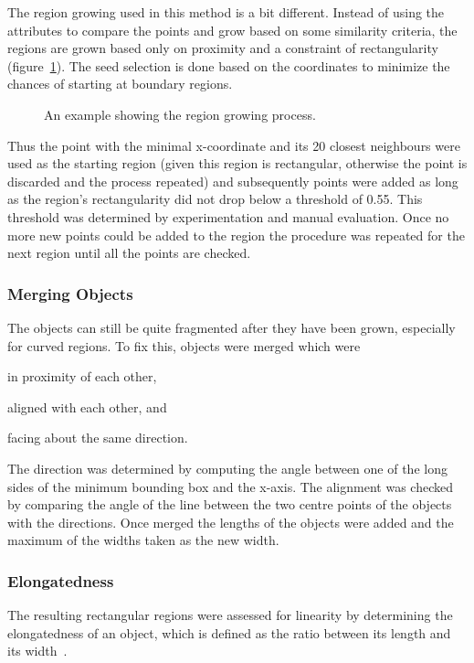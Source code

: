 {The region growing used in this method is a bit different. Instead of using the attributes to compare the points and grow based on some similarity criteria, the regions are grown based only on proximity and a constraint of rectangularity (figure~\ref{fig:regiongrowing}). The seed selection is done based on the coordinates to minimize the chances of starting at boundary regions.

\begin{figure}
	\centering
	
	\caption{An example showing the region growing process.}
	\label{fig:regiongrowing}
\end{figure}

Thus the point with the minimal x-coordinate and its 20 closest neighbours were used as the starting region (given this region is rectangular, otherwise the point is discarded and the process repeated) and subsequently points were added as long as the region’s rectangularity did not drop below a threshold of 0.55. This threshold was determined by experimentation and manual evaluation. Once no more new points could be added to the region the procedure was repeated for the next region until all the points are checked.

\subsubsection{Merging Objects}
The objects can still be quite fragmented after they have been grown, especially for curved regions. To fix this, objects were merged which were
\begin{enumerate*}[(i)]
	\item in proximity of each other,
	\item aligned with each other, and
	\item facing about the same direction.
\end{enumerate*}
The direction was determined by computing the angle between one of the long sides of the minimum bounding box and the x-axis. The alignment was checked by comparing the angle of the line between the two centre points of the objects with the directions. Once merged the lengths of the objects were added and the maximum of the widths taken as the new width.

\subsubsection{Elongatedness}
The resulting rectangular regions were assessed for linearity by determining the elongatedness of an object, which is defined as the ratio between its length and its width~\citep{nagao2013structural}. 

}
